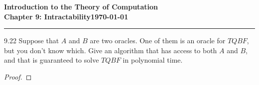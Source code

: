 \documentclass[11pt]{article}
\newcommand{\dated}{\today}
\begin{document}
\textbf{Introduction to the Theory of
Computation}\hfill\textbf{\myname}\\[0.01in]
\textbf{Chapter 9: Intractability}\hfill\textbf{\dated}\\
\smallskip\hrule\bigskip

\begin{problem}{9.22}
Suppose that $A$ and $B$ are two oracles. One of them is an oracle for $TQBF$, but you don't know which. Give an algorithm that has access to both $A$ and $B$, and that is guaranteed to solve $TQBF$ in polynomial time.
\end{problem}

\begin{proof}
\end{proof}
\end{document}
